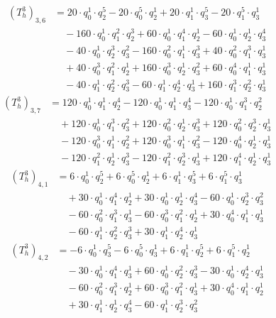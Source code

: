 \begin{align*}(T_{h}^3)_{3,6}&=20\cdot q_0^{1}\cdot q_2^{5}-20\cdot q_0^{5}\cdot q_2^{1}+20\cdot q_1^{1}\cdot q_3^{5}-20\cdot q_1^{5}\cdot q_3^{1}\\
&\quad -160\cdot q_0^{1}\cdot q_1^{2}\cdot q_2^{3}+60\cdot q_0^{1}\cdot q_1^{4}\cdot q_2^{1}-60\cdot q_0^{1}\cdot q_2^{1}\cdot q_3^{4}\\
&\quad -40\cdot q_0^{1}\cdot q_2^{3}\cdot q_3^{2}-160\cdot q_0^{2}\cdot q_1^{1}\cdot q_3^{3}+40\cdot q_0^{2}\cdot q_1^{3}\cdot q_3^{1}\\
&\quad +40\cdot q_0^{3}\cdot q_1^{2}\cdot q_2^{1}+160\cdot q_0^{3}\cdot q_2^{1}\cdot q_3^{2}+60\cdot q_0^{4}\cdot q_1^{1}\cdot q_3^{1}\\
&\quad -40\cdot q_1^{1}\cdot q_2^{2}\cdot q_3^{3}-60\cdot q_1^{1}\cdot q_2^{4}\cdot q_3^{1}+160\cdot q_1^{3}\cdot q_2^{2}\cdot q_3^{1}\end{align*}
\begin{align*}(T_{h}^3)_{3,7}&=120\cdot q_0^{1}\cdot q_1^{1}\cdot q_2^{4}-120\cdot q_0^{1}\cdot q_1^{1}\cdot q_3^{4}-120\cdot q_0^{1}\cdot q_1^{3}\cdot q_2^{2}\\
&\quad +120\cdot q_0^{1}\cdot q_1^{3}\cdot q_3^{2}+120\cdot q_0^{2}\cdot q_2^{1}\cdot q_3^{3}+120\cdot q_0^{2}\cdot q_2^{3}\cdot q_3^{1}\\
&\quad -120\cdot q_0^{3}\cdot q_1^{1}\cdot q_2^{2}+120\cdot q_0^{3}\cdot q_1^{1}\cdot q_3^{2}-120\cdot q_0^{4}\cdot q_2^{1}\cdot q_3^{1}\\
&\quad -120\cdot q_1^{2}\cdot q_2^{1}\cdot q_3^{3}-120\cdot q_1^{2}\cdot q_2^{3}\cdot q_3^{1}+120\cdot q_1^{4}\cdot q_2^{1}\cdot q_3^{1}\end{align*}
\begin{align*}(T_{h}^3)_{4,1}&=6\cdot q_0^{1}\cdot q_2^{5}+6\cdot q_0^{5}\cdot q_2^{1}+6\cdot q_1^{1}\cdot q_3^{5}+6\cdot q_1^{5}\cdot q_3^{1}\\
&\quad +30\cdot q_0^{1}\cdot q_1^{4}\cdot q_2^{1}+30\cdot q_0^{1}\cdot q_2^{1}\cdot q_3^{4}-60\cdot q_0^{1}\cdot q_2^{3}\cdot q_3^{2}\\
&\quad -60\cdot q_0^{2}\cdot q_1^{3}\cdot q_3^{1}-60\cdot q_0^{3}\cdot q_1^{2}\cdot q_2^{1}+30\cdot q_0^{4}\cdot q_1^{1}\cdot q_3^{1}\\
&\quad -60\cdot q_1^{1}\cdot q_2^{2}\cdot q_3^{3}+30\cdot q_1^{1}\cdot q_2^{4}\cdot q_3^{1}\end{align*}
\begin{align*}(T_{h}^3)_{4,2}&=-6\cdot q_0^{1}\cdot q_3^{5}-6\cdot q_0^{5}\cdot q_3^{1}+6\cdot q_1^{1}\cdot q_2^{5}+6\cdot q_1^{5}\cdot q_2^{1}\\
&\quad -30\cdot q_0^{1}\cdot q_1^{4}\cdot q_3^{1}+60\cdot q_0^{1}\cdot q_2^{2}\cdot q_3^{3}-30\cdot q_0^{1}\cdot q_2^{4}\cdot q_3^{1}\\
&\quad -60\cdot q_0^{2}\cdot q_1^{3}\cdot q_2^{1}+60\cdot q_0^{3}\cdot q_1^{2}\cdot q_3^{1}+30\cdot q_0^{4}\cdot q_1^{1}\cdot q_2^{1}\\
&\quad +30\cdot q_1^{1}\cdot q_2^{1}\cdot q_3^{4}-60\cdot q_1^{1}\cdot q_2^{3}\cdot q_3^{2}\end{align*}
